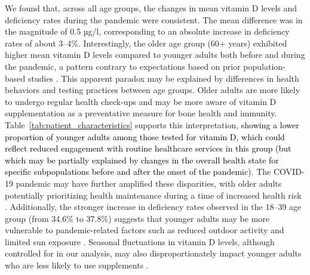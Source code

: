 \documentclass[12pt]{article}
\newcommand{\REV}[1]{\textcolor{black}{#1}}
\begin{document}
We found that, across all age groups, the changes in mean vitamin D levels and deficiency rates during the pandemic were  consistent. The mean difference was in the magnitude of 0.5 µg/l, corresponding to an absolute increase in deficiency rates of about 3--4\%. Interestingly, the older age group (60+ years) exhibited higher mean vitamin D levels compared to younger adults both before and during the pandemic, a pattern contrary to expectations based on prior population-based studies \cite{Rabenberg2015}. This apparent paradox may be explained by differences in health behaviors and testing practices between age groups. Older adults are more likely to undergo regular health check-ups and may be more aware of vitamin D supplementation as a preventative measure for bone health and immunity. Table~\ref{tab:patient_characteristics} supports this interpretation, \REV{showing a lower proportion of younger adults among those tested for vitamin D, which could reflect reduced engagement with routine healthcare services in this group (but which may be partially explained by changes in the overall health state for specific subpopulations before and after the onset of the pandemic)}. The COVID-19 pandemic may have further amplified these disparities, with older adults potentially prioritizing health maintenance during a time of increased health risk \cite{Ibsen2024}. Additionally, the stronger increase in deficiency rates observed in the 18--39 age group (from 34.6\% to 37.8\%) suggests that younger adults may be more vulnerable to pandemic-related factors such as reduced outdoor activity and limited sun exposure \cite{Barber2021}. Seasonal fluctuations in vitamin D levels, although controlled for in our analysis, may also disproportionately impact younger adults who are less likely to use supplements \cite{Dickinson2014}.
\end{document}

